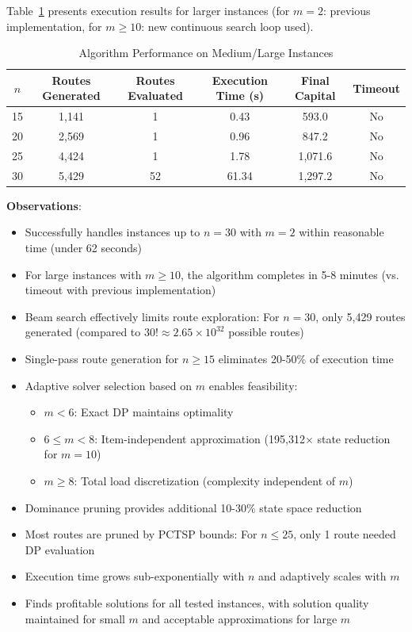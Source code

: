 \documentclass[12pt]{article}
\begin{document}
Table~\ref{tab:performance} presents execution results for larger instances (for $m=2$: previous implementation, for $m \geq 10$: new continuous search loop used).

\begin{table}[h]
\centering
\caption{Algorithm Performance on Medium/Large Instances}
\label{tab:performance}
\begin{tabular}{c|ccccc}
\toprule
$n$ & Routes Generated & Routes Evaluated & Execution Time (s) & Final Capital & Timeout \\
\midrule
15 & 1,141 & 1 & 0.43 & 593.0 & No \\
20 & 2,569 & 1 & 0.96 & 847.2 & No \\
25 & 4,424 & 1 & 1.78 & 1,071.6 & No \\
30 & 5,429 & 52 & 61.34 & 1,297.2 & No \\
\bottomrule
\end{tabular}
\end{table}

\textbf{Observations}:
\begin{itemize}
    \item Successfully handles instances up to $n=30$ with $m=2$ within reasonable time (under 62 seconds)
    \item For large instances with $m \geq 10$, the algorithm completes in 5-8 minutes (vs. timeout with previous implementation)
    \item Beam search effectively limits route exploration: For $n=30$, only 5,429 routes generated (compared to $30! \approx 2.65 \times 10^{32}$ possible routes)
    \item Single-pass route generation for $n \geq 15$ eliminates 20-50\% of execution time
    \item Adaptive solver selection based on $m$ enables feasibility:
    \begin{itemize}
        \item $m < 6$: Exact DP maintains optimality
        \item $6 \leq m < 8$: Item-independent approximation (195,312$\times$ state reduction for $m=10$)
        \item $m \geq 8$: Total load discretization (complexity independent of $m$)
    \end{itemize}
    \item Dominance pruning provides additional 10-30\% state space reduction
    \item Most routes are pruned by PCTSP bounds: For $n \leq 25$, only 1 route needed DP evaluation
    \item Execution time grows sub-exponentially with $n$ and adaptively scales with $m$
    \item Finds profitable solutions for all tested instances, with solution quality maintained for small $m$ and acceptable approximations for large $m$
\end{itemize}
\end{document}
